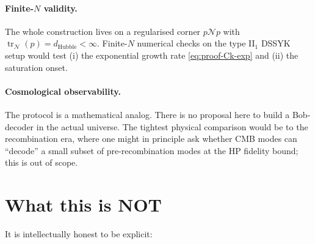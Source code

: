 \documentclass[11pt]{article}
\theoremstyle{definition}
\theoremstyle{remark}
\newcommand{\N}{\mathcal{N}}
\newcommand{\tr}{\operatorname{tr}}
\begin{document}
\paragraph{Finite-$N$ validity.} The whole construction lives on a
regularised corner $p\N p$ with $\tr_\N(p)=d_{\mathrm{Hubble}}<\infty$.
Finite-$N$ numerical checks on the type II$_1$ DSSYK setup
\cite{AguilarGutierrez25} would test (i) the exponential growth rate
\eqref{eq:proof-Ck-exp} and (ii) the saturation onset.

\paragraph{Cosmological observability.} The protocol is a mathematical
analog. There is no proposal here to build a Bob-decoder in the actual
universe. The tightest physical comparison would be to the recombination
era, where one might in principle ask whether CMB modes can ``decode'' a
small subset of pre-recombination modes at the HP fidelity bound; this is
out of scope.

\section{What this is NOT}
\label{sec:not}

It is intellectually honest to be explicit:
\end{document}

